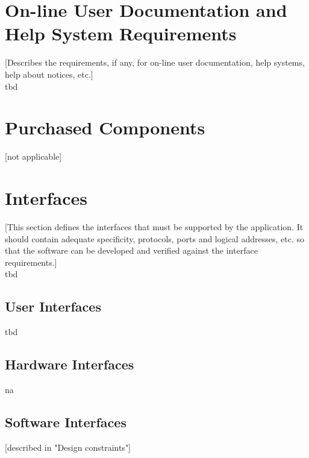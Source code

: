 \documentclass[a4paper,12pt,chapterprefix=false,bibliography=totoc,listof=totoc,]{scrreprt}
\begin{document}
\section{{\color{blue} On-line User Documentation and Help System Requirements}}
{\color{blue} [Describes the requirements, if any, for on-line user documentation, help systems, help about notices, etc.]}\\

\gls{tbd}

\section{Purchased Components}
[not applicable]

\section{{\color{blue} Interfaces}}
{\color{blue} [This section defines the interfaces that must be supported by the application. It should contain adequate specificity, protocols, ports and logical addresses, etc. so that the software can be developed and verified against the interface requirements.]}\\

\gls{tbd}

\subsection{{\color{blue} User Interfaces}}
\gls{tbd}

\subsection{Hardware Interfaces}
\gls{na}

\subsection{Software Interfaces}
[described in "Design constraints"]
\end{document}
